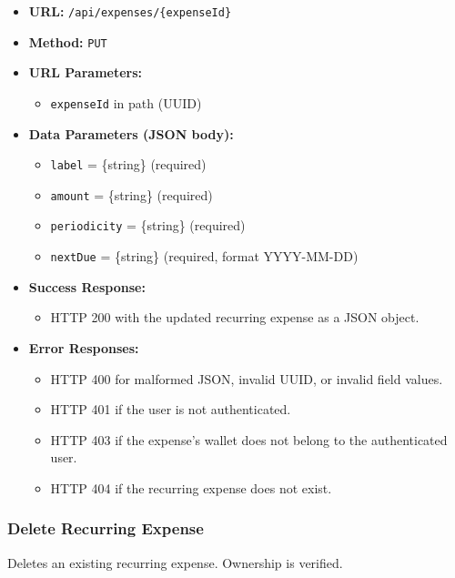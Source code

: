 \begin{itemize}
    \item \textbf{URL:} \texttt{/api/expenses/\{expenseId\}}
    \item \textbf{Method:} \texttt{PUT}
    \item \textbf{URL Parameters:}
    \begin{itemize}
        \item \texttt{expenseId} in path (UUID)
    \end{itemize}
    \item \textbf{Data Parameters (JSON body):}
    \begin{itemize}
        \item \texttt{label} = \{string\} (required)
        \item \texttt{amount} = \{string\} (required)
        \item \texttt{periodicity} = \{string\} (required)
        \item \texttt{nextDue} = \{string\} (required, format YYYY-MM-DD)
    \end{itemize}
    \item \textbf{Success Response:}
    \begin{itemize}
        \item HTTP 200 with the updated recurring expense as a JSON object.
    \end{itemize}
    \item \textbf{Error Responses:}
    \begin{itemize}
        \item HTTP 400 for malformed JSON, invalid UUID, or invalid field values.
        \item HTTP 401 if the user is not authenticated.
        \item HTTP 403 if the expense's wallet does not belong to the authenticated user.
        \item HTTP 404 if the recurring expense does not exist.
    \end{itemize}
\end{itemize}

\subsubsection{Delete Recurring Expense}

Deletes an existing recurring expense. Ownership is verified.

